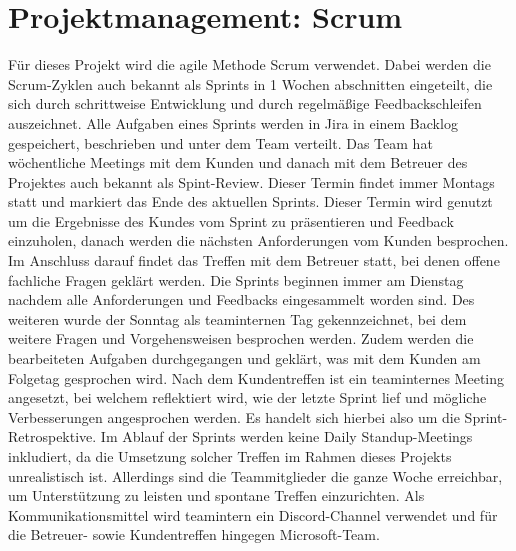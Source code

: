 \documentclass[a4paper,12pt]{article}
\begin{document}
\section{Projektmanagement: Scrum}
Für dieses Projekt wird die agile Methode Scrum verwendet. Dabei werden die Scrum-Zyklen auch bekannt als Sprints in 1 Wochen abschnitten eingeteilt, die sich durch schrittweise Entwicklung und durch regelmäßige Feedbackschleifen auszeichnet. Alle Aufgaben eines Sprints werden in Jira in einem Backlog gespeichert, beschrieben und unter dem Team verteilt.
\newline
\newline
Das Team hat wöchentliche Meetings mit dem Kunden und danach mit dem Betreuer des Projektes auch bekannt als Spint-Review. Dieser Termin findet immer Montags statt und markiert das Ende des aktuellen Sprints. Dieser Termin wird genutzt um die Ergebnisse des Kundes vom Sprint zu präsentieren und Feedback einzuholen, danach werden die nächsten Anforderungen vom Kunden besprochen. Im Anschluss darauf findet das Treffen mit dem Betreuer statt, bei denen offene fachliche Fragen geklärt werden. 
\newline
\newline
Die Sprints beginnen immer am Dienstag nachdem alle Anforderungen und Feedbacks eingesammelt worden sind. Des weiteren wurde der Sonntag als teaminternen Tag gekennzeichnet, bei dem weitere Fragen und Vorgehensweisen besprochen werden. Zudem werden die bearbeiteten Aufgaben durchgegangen und geklärt, was mit dem Kunden am Folgetag gesprochen wird. Nach dem Kundentreffen ist ein teaminternes Meeting angesetzt, bei welchem reflektiert wird, wie der letzte Sprint lief und mögliche Verbesserungen angesprochen werden. Es handelt sich hierbei also um die Sprint-Retrospektive. 
\newline
\newline
Im Ablauf der Sprints werden keine Daily Standup-Meetings inkludiert, da die Umsetzung solcher Treffen im Rahmen dieses Projekts unrealistisch ist. Allerdings sind die Teammitglieder die ganze Woche erreichbar, um Unterstützung zu leisten und spontane Treffen einzurichten. Als Kommunikationsmittel wird teamintern ein Discord-Channel verwendet und für die Betreuer- sowie Kundentreffen hingegen Microsoft-Team.
\newpage
\end{document}
